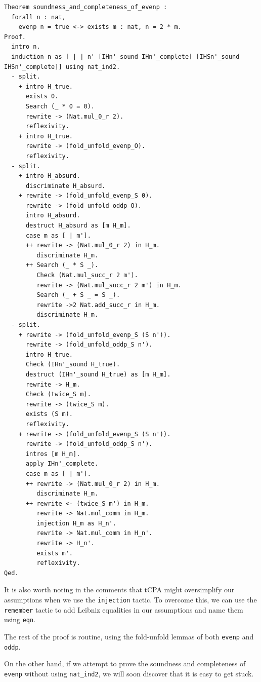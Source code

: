 \documentclass{article}
\begin{document}
\begin{lstlisting}
Theorem soundness_and_completeness_of_evenp :
  forall n : nat,
    evenp n = true <-> exists m : nat, n = 2 * m.
Proof.
  intro n.
  induction n as [ | | n' [IHn'_sound IHn'_complete] [IHSn'_sound IHSn'_complete]] using nat_ind2.
  - split.
    + intro H_true.
      exists 0.
      Search (_ * 0 = 0).
      rewrite -> (Nat.mul_0_r 2).
      reflexivity.
    + intro H_true.
      rewrite -> (fold_unfold_evenp_O).
      reflexivity.
  - split.
    + intro H_absurd.
      discriminate H_absurd.
    + rewrite -> (fold_unfold_evenp_S 0).
      rewrite -> (fold_unfold_oddp_O).
      intro H_absurd.
      destruct H_absurd as [m H_m].
      case m as [ | m'].
      ++ rewrite -> (Nat.mul_0_r 2) in H_m.
         discriminate H_m.
      ++ Search (_ * S _).
         Check (Nat.mul_succ_r 2 m').
         rewrite -> (Nat.mul_succ_r 2 m') in H_m.
         Search (_ + S _ = S _).
         rewrite ->2 Nat.add_succ_r in H_m.
         discriminate H_m.
  - split.
    + rewrite -> (fold_unfold_evenp_S (S n')).
      rewrite -> (fold_unfold_oddp_S n').
      intro H_true.
      Check (IHn'_sound H_true).
      destruct (IHn'_sound H_true) as [m H_m].
      rewrite -> H_m.
      Check (twice_S m).
      rewrite -> (twice_S m).
      exists (S m).
      reflexivity.   
    + rewrite -> (fold_unfold_evenp_S (S n')).
      rewrite -> (fold_unfold_oddp_S n').
      intros [m H_m].
      apply IHn'_complete.
      case m as [ | m'].
      ++ rewrite -> (Nat.mul_0_r 2) in H_m.
         discriminate H_m.
      ++ rewrite <- (twice_S m') in H_m.
         rewrite -> Nat.mul_comm in H_m.
         injection H_m as H_n'.
         rewrite -> Nat.mul_comm in H_n'.
         rewrite -> H_n'.
         exists m'.
         reflexivity.
Qed.
\end{lstlisting}

It is also worth noting in the comments that tCPA might oversimplify our assumptions when we use the \texttt{injection} tactic. To overcome this, we can use the \texttt{remember} tactic to add Leibniz equalities in our assumptions and name them using \texttt{eqn}.

The rest of the proof is routine, using the fold-unfold lemmas of both \texttt{evenp} and \texttt{oddp}.

On the other hand, if we attempt to prove the soundness and completeness of \texttt{evenp} without using \texttt{nat\_ind2}, we will soon discover that it is easy to get stuck. 
\end{document}
